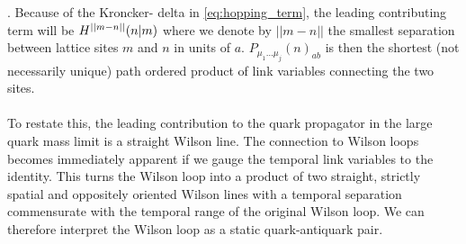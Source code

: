 \documentclass[a4paper,10pt]{article}
\begin{document}
\cite{Gattringer:2010zz}. Because of the Kroncker- delta in \eqref{eq:hopping_term}, the leading contributing term will be $H^{||m-n||}(n\mkern-5mu \mid\mkern-5mu m)$ where we denote by $||m-n||$ the smallest separation between lattice sites $m$ and $n$ in units of $a$. $P_{\mu_{1} \ldots \mu_{j}}(n)_{a b}$ is then the shortest (not necessarily unique) path ordered product of link variables connecting the two sites.\\\\To restate this, the leading contribution to the quark propagator in the large quark mass limit is a straight Wilson line. The connection to Wilson loops becomes immediately apparent if we gauge the temporal link variables to the identity. This turns the Wilson loop into a product of two straight, strictly spatial and oppositely oriented Wilson lines with a temporal separation commensurate with the temporal range of the original Wilson loop. We can therefore interpret the Wilson loop as a static quark-antiquark pair.
\end{document}
